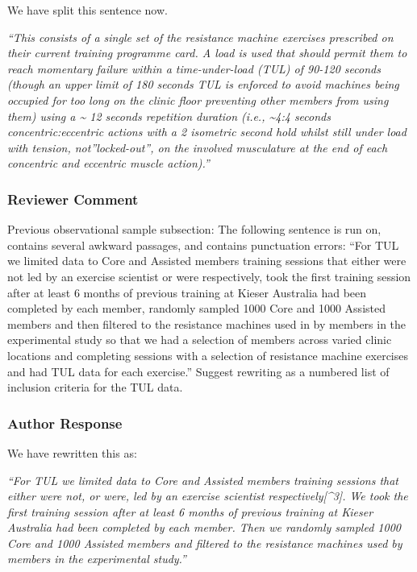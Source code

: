 \documentclass[
  letterpaper,
  DIV=11,
  numbers=noendperiod]{scrartcl}
\begin{document}
We have split this sentence now.

\emph{``This consists of a single set of the resistance machine
exercises prescribed on their current training programme card. A load is
used that should permit them to reach momentary failure within a
time-under-load (TUL) of 90-120 seconds (though an upper limit of 180
seconds TUL is enforced to avoid machines being occupied for too long on
the clinic floor preventing other members from using them) using a
\textasciitilde{} 12 seconds repetition duration (i.e.,
\textasciitilde4:4 seconds concentric:eccentric actions with a 2
isometric second hold whilst still under load with tension,
not''locked-out'', on the involved musculature at the end of each
concentric and eccentric muscle action).''}

\hypertarget{reviewer-comment-8}{%
\subsubsection{Reviewer Comment}\label{reviewer-comment-8}}

Previous observational sample subsection: The following sentence is run
on, contains several awkward passages, and contains punctuation errors:
``For TUL we limited data to Core and Assisted members training sessions
that either were not led by an exercise scientist or were respectively,
took the first training session after at least 6 months of previous
training at Kieser Australia had been completed by each member, randomly
sampled 1000 Core and 1000 Assisted members and then filtered to the
resistance machines used in by members in the experimental study so that
we had a selection of members across varied clinic locations and
completing sessions with a selection of resistance machine exercises and
had TUL data for each exercise.'' Suggest rewriting as a numbered list
of inclusion criteria for the TUL data.

\hypertarget{author-response-8}{%
\subsubsection{Author Response}\label{author-response-8}}

We have rewritten this as:

\emph{``For TUL we limited data to Core and Assisted members training
sessions that either were not, or were, led by an exercise scientist
respectively{[}\^{}3{]}. We took the first training session after at
least 6 months of previous training at Kieser Australia had been
completed by each member. Then we randomly sampled 1000 Core and 1000
Assisted members and filtered to the resistance machines used by members
in the experimental study.''}
\end{document}
